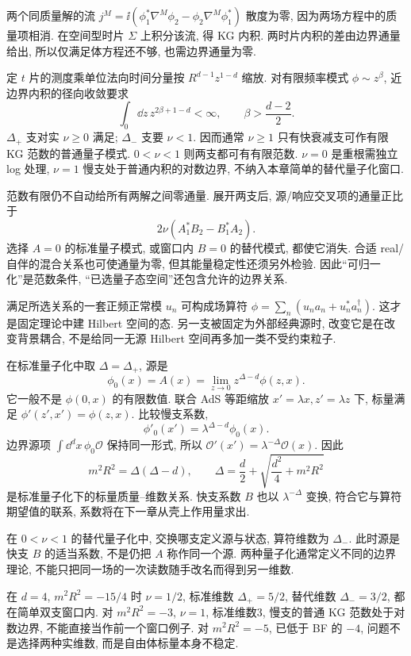 两个同质量解的流 $j^M=\ii(\phi_1^*\nabla^M\phi_2-\phi_2\nabla^M\phi_1^*)$ 散度为零, 因为两场方程中的质量项相消. 在空间型时片 $\Sigma$ 上积分该流, 得 KG 内积. 两时片内积的差由边界通量给出, 所以仅满足体方程还不够, 也需边界通量为零.

定 $t$ 片的测度乘单位法向时间分量按 $R^{d-1}z^{1-d}$ 缩放. 对有限频率模式 $\phi\sim z^\beta$, 近边界内积的径向收敛要求
\[
\int_0\dd z\,z^{2\beta+1-d}<\infty,
\qquad \beta>\frac{d-2}2.
\]
$\Delta_+$ 支对实 $\nu\ge0$ 满足; $\Delta_-$ 支要 $\nu<1$. 因而通常 $\nu\ge1$ 只有快衰减支可作有限 KG 范数的普通量子模式. $0<\nu<1$ 则两支都可有有限范数. $\nu=0$ 是重根需独立 log 处理, $\nu=1$ 慢支处于普通内积的对数边界, 不纳入本章简单的替代量子化窗口.

范数有限仍不自动给所有两解之间零通量. 展开两支后, 源/响应交叉项的通量正比于
\[
2\nu(A_1^*B_2-B_1^*A_2).
\]
选择 $A=0$ 的标准量子模式, 或窗口内 $B=0$ 的替代模式, 都使它消失. 合适 real/自伴的混合关系也可使通量为零, 但其能量稳定性还须另外检验. 因此“可归一化”是范数条件, “已选量子态空间”还包含允许的边界关系.

满足所选关系的一套正频正常模 $u_n$ 可构成场算符 $\phi=\sum_n(u_na_n+u_n^*a_n^\dagger)$. 这才是固定理论中建 Hilbert 空间的态. 另一支被固定为外部经典源时, 改变它是在改变背景耦合, 不是给同一无源 Hilbert 空间再多加一类不受约束粒子.

在标准量子化中取 $\Delta=\Delta_+$, 源是
\[
\phi_0(x)=A(x)=\lim_{z\to0}z^{\Delta-d}\phi(z,x).
\]
它一般不是 $\phi(0,x)$ 的有限数值. 联合 AdS 等距缩放 $x'=\lambda x,z'=\lambda z$ 下, 标量满足 $\phi'(z',x')=\phi(z,x)$. 比较慢支系数,
\[
\phi'_0(x')=\lambda^{\Delta-d}\phi_0(x).
\]
边界源项 $\int\dd^dx\,\phi_0\mathcal O$ 保持同一形式, 所以 $\mathcal O'(x')=\lambda^{-\Delta}\mathcal O(x)$. 因此
\[
\boxed{m^2R^2=\Delta(\Delta-d),\qquad
\Delta=\frac d2+\sqrt{\frac{d^2}4+m^2R^2}}
\]
是标准量子化下的标量质量--维数关系. 快支系数 $B$ 也以 $\lambda^{-\Delta}$ 变换, 符合它与算符期望值的联系, 系数将在下一章从壳上作用量求出.

在 $0<\nu<1$ 的替代量子化中, 交换哪支定义源与状态, 算符维数为 $\Delta_-$. 此时源是快支 $B$ 的适当系数, 不是仍把 $A$ 称作同一个源. 两种量子化通常定义不同的边界理论, 不能只把同一场的一次读数随手改名而得到另一维数.

\begin{example}
在 $d=4$, $m^2R^2=-15/4$ 时 $\nu=1/2$, 标准维数 $\Delta_+=5/2$, 替代维数 $\Delta_-=3/2$, 都在简单双支窗口内. 对 $m^2R^2=-3$, $\nu=1$, 标准维数3, 慢支的普通 KG 范数处于对数边界, 不能直接当作前一个窗口例子. 对 $m^2R^2=-5$, 已低于 BF 的 $-4$, 问题不是选择两种实维数, 而是自由体标量本身不稳定.
\end{example}

